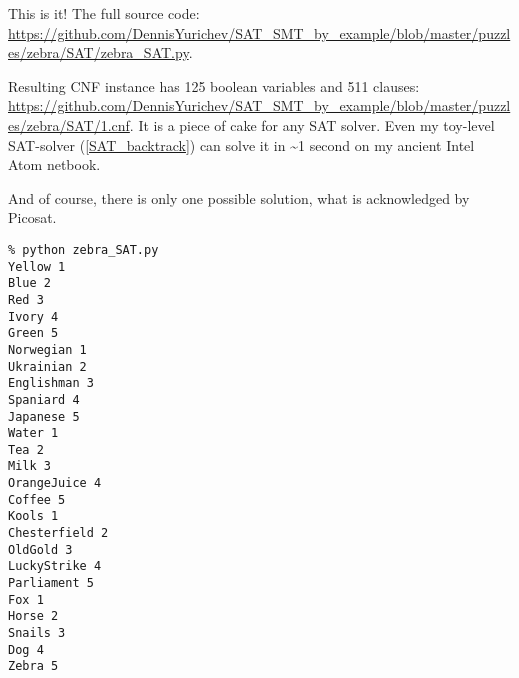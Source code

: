 This is it!
The full source code: \url{https://github.com/DennisYurichev/SAT_SMT_by_example/blob/master/puzzles/zebra/SAT/zebra_SAT.py}.

Resulting CNF instance has 125 boolean variables and 511 clauses: \\
\url{https://github.com/DennisYurichev/SAT_SMT_by_example/blob/master/puzzles/zebra/SAT/1.cnf}.
It is a piece of cake for any SAT solver.
Even my toy-level SAT-solver (\ref{SAT_backtrack}) can solve it in \textasciitilde{}1 second on my ancient Intel Atom netbook.

And of course, there is only one possible solution, what is acknowledged by Picosat.

\begin{lstlisting}
% python zebra_SAT.py
Yellow 1
Blue 2
Red 3
Ivory 4
Green 5
Norwegian 1
Ukrainian 2
Englishman 3
Spaniard 4
Japanese 5
Water 1
Tea 2
Milk 3
OrangeJuice 4
Coffee 5
Kools 1
Chesterfield 2
OldGold 3
LuckyStrike 4
Parliament 5
Fox 1
Horse 2
Snails 3
Dog 4
Zebra 5
\end{lstlisting}

